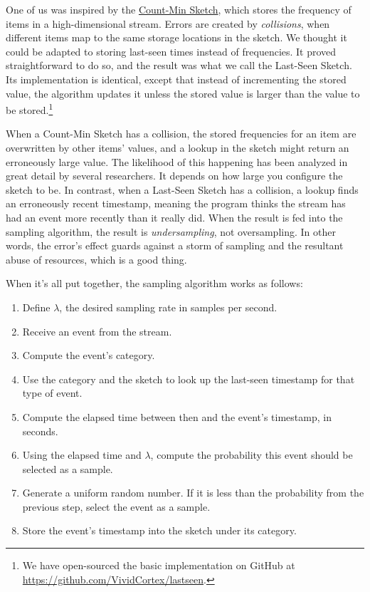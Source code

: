 \documentclass{vivid_layout}
\begin{document}
One of us was inspired by the
\href{https://en.wikipedia.org/wiki/Count\%E2\%80\%93min\_sketch}{Count-Min
Sketch}, which stores the frequency of items in a high-dimensional stream.
Errors are created by \emph{collisions}, when different items map to the same
storage locations in the sketch. We thought it could be adapted to storing
last-seen times instead of frequencies. It proved straightforward to do so, and
the result was what we call the Last-Seen Sketch. Its implementation is
identical, except that instead of incrementing the stored value, the algorithm
updates it unless the stored value is larger than the value to be
stored.\footnote{We have open-sourced the basic implementation on GitHub at
\href{https://github.com/VividCortex/lastseen}{https://github.com/VividCortex/lastseen}.}

When a Count-Min Sketch has a collision, the stored frequencies for an item are
overwritten by other items' values, and a lookup in the sketch might return an
erroneously large value. The likelihood of this happening has been analyzed in
great detail by several researchers. It depends on how large you configure the
sketch to be. In contrast, when a Last-Seen Sketch has a collision, a lookup
finds an erroneously recent timestamp, meaning the program thinks the stream has
had an event more recently than it really did. When the result is fed into the
sampling algorithm, the result is \emph{undersampling}, not oversampling. In
other words, the error's effect guards against a storm of sampling and the
resultant abuse of resources, which is a good thing.

When it's all put together, the sampling algorithm works as follows:

\begin{enumerate}
\item Define $\lambda$, the desired sampling rate in samples per second.
\item Receive an event from the stream.
\item Compute the event's category.
\item Use the category and the sketch to look up the last-seen timestamp for that type of event.
\item Compute the elapsed time between then and the event's timestamp, in seconds.
\item Using the elapsed time and $\lambda$, compute the probability this event should be selected as a sample.
\item Generate a uniform random number. If it is less than the probability from the previous step, select the event as a sample.
\item Store the event's timestamp into the sketch under its category.
\end{enumerate}
\end{document}
